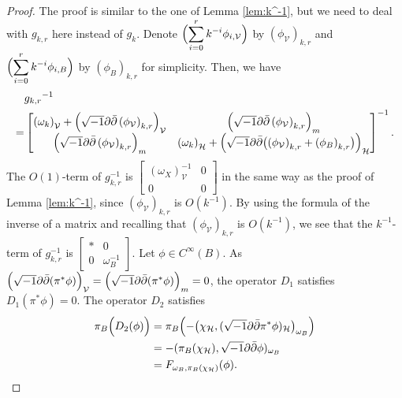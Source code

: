 \documentclass{amsart}
\numberwithin{equation}{section}
\theoremstyle{plain}
\theoremstyle{definition}
\theoremstyle{remark}
\begin{document}
\begin{proof}
The proof is similar to the one of Lemma \ref{lem:k^-1}, but we need to deal with $g_{k,r}$ here instead of $g_k$. 
Denote $\Bigl( \displaystyle\sum_{i=0}^r k^{-i} \phi_{i, \mathcal{V}} \Bigr)$ by $\left( \phi_\mathcal{V} \right)_{k,r}$ and 
$\Bigl( \displaystyle\sum_{i=0}^r k^{-i} \phi_{i, B} \Bigr)$ by $\left( \phi_B \right)_{k,r}$ for simplicity. 
Then, we have
\begin{align*}
&{g_{k,r}}^{-1} \\ 
= &\begin{bmatrix}
    \left( \omega_k \right)_\mathcal{V} + \Bigl(\sqrt{-1} \partial \bar{\partial} \left( \phi_\mathcal{V} \right)_{k,r}\Bigr)_\mathcal{V}
    & \Bigl(\sqrt{-1} \partial \bar{\partial} \left( \phi_\mathcal{V} \right)_{k,r}\Bigr)_m  \\
     \Bigl(\sqrt{-1} \partial \bar{\partial} \left( \phi_\mathcal{V} \right)_{k,r}\Bigr)_m
     & \left( \omega_k \right)_\mathcal{H} + \Bigl(\sqrt{-1} \partial \bar{\partial} \bigl(\left( \phi_\mathcal{V} \right)_{k,r} + \left( \phi_B \right)_{k,r} \bigr)\Bigr)_\mathcal{H}
\end{bmatrix}^{-1}.
\end{align*}  
The $O\left( 1 \right)$-term of $g_{k, r}^{-1}$ is 
$\begin{bmatrix}
   \left( \omega_X \right)_\mathcal{V}^{-1} & 0 \\
   0 & 0
\end{bmatrix}$ in the same way as the proof of Lemma \ref{lem:k^-1}, since $\left( \phi_\mathcal{V} \right)_{k,r}$ is $O \left( k^{-1} \right)$. By using the formula of the inverse of a matrix and recalling that $\left( \phi_\mathcal{V} \right)_{k,r}$ is $O \left( k^{-1} \right)$, we see that the $k^{-1}$-term of $g_{k, r}^{-1}$ is 
$ \begin{bmatrix}
*  & 0 \\ 0 & \omega_B^{-1}
\end{bmatrix}$.
Let $\phi \in C^\infty(B)$.
As $\Bigl(\sqrt{-1}\partial\bar{\partial} (\pi^*\phi)\Bigr)_\mathcal{V} = \Bigl(\sqrt{-1}\partial\bar{\partial} (\pi^*\phi)\Bigr)_m =0$, the operator $D_1$ satisfies
$D_1 (\pi^*\phi) = 0$. 
The operator $D_2$ satisfies
\begin{align*}
\pi_B \Bigl( D_2(\phi) \Bigr) 
&= \pi_B \Bigl(- \bigl( \chi_\mathcal{H} , (\sqrt{-1} \partial \bar{\partial} \pi^*\phi)_\mathcal{H}\bigl)_{\omega_B} \Bigr) \\
&={- ( \pi_B(\chi_\mathcal{H}) , \sqrt{-1} \partial \bar{\partial} \phi)_{\omega_B} }\\
&= F_{\omega_B, \pi_B(\chi_\mathcal{H})} (\phi).
\qedhere
\end{align*}
\end{proof}
\end{document}
